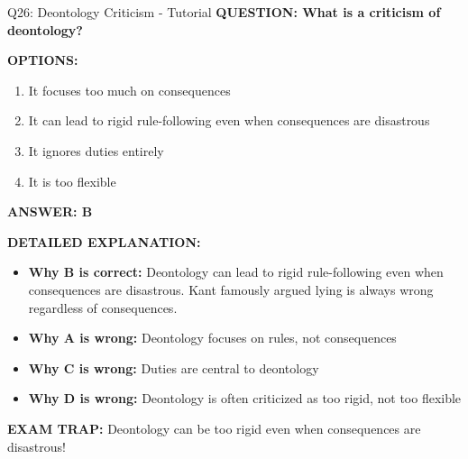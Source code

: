 \documentclass[8pt]{beamer}
\begin{document}
	\begin{frame}{Q26: Deontology Criticism - Tutorial}
		\fontsize{6.5}{7.5}\selectfont
		\textbf{QUESTION: What is a criticism of deontology?}
		
		\vspace{0.1cm}
		\textbf{OPTIONS:}
		\begin{enumerate}
			\item It focuses too much on consequences
			\item It can lead to rigid rule-following even when consequences are disastrous
			\item It ignores duties entirely
			\item It is too flexible
		\end{enumerate}
		
		\vspace{0.1cm}
		\textcolor{myblue}{\textbf{ANSWER: B}}
		
		\vspace{0.1cm}
		\textbf{DETAILED EXPLANATION:}
		\begin{itemize}
			\item \textbf{Why B is correct:} Deontology can lead to rigid rule-following even when consequences are disastrous. Kant famously argued lying is always wrong regardless of consequences.
			\item \textbf{Why A is wrong:} Deontology focuses on rules, not consequences
			\item \textbf{Why C is wrong:} Duties are central to deontology
			\item \textbf{Why D is wrong:} Deontology is often criticized as too rigid, not too flexible
		\end{itemize}
		
		\textcolor{myred}{\textbf{EXAM TRAP:}} Deontology can be \textcolor{myblue}{too rigid} even when consequences are disastrous!
	\end{frame}
	
\end{document}
